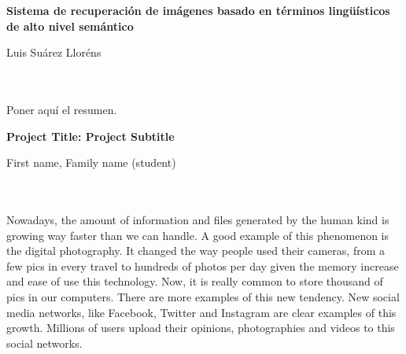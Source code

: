 
\cleardoublepage
\thispagestyle{empty}

\begin{center}
{\large\bfseries Sistema de recuperación de imágenes basado en
términos lingüísticos de alto nivel semántico}\\
\end{center}
\begin{center}
Luis Suárez Lloréns\\
\end{center}

\\

\vspace{0.7cm}
\\

Poner aquí el resumen.
\cleardoublepage


\thispagestyle{empty}

\begin{center}
{\large\bfseries Project Title: Project Subtitle}\\
\end{center}
\begin{center}
First name, Family name (student)\\
\end{center}

\\

\vspace{0.7cm}
\\

Nowadays, the amount of information and files generated by the human kind is growing way faster than we can handle. A good example of this phenomenon is the digital photography. It changed the way people used their cameras, from a few pics in every travel to hundreds of photos per day given the memory increase and ease of use this technology. Now, it is really common to store thousand of pics in our computers.  There are more examples of this new tendency.  New social media networks, like Facebook, Twitter and Instagram are clear examples of this growth. Millions of users upload their opinions, photographies and videos to this social networks. 

